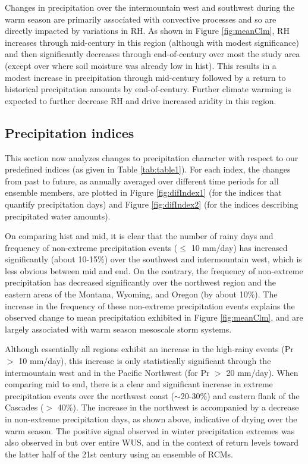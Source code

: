 \documentclass{ametsoc}
\begin{document}
Changes in precipitation over the intermountain west and southwest during the warm season are primarily associated with convective processes and so are directly impacted by variations in RH.  As shown in Figure \ref{fig:meanClm}, RH increases through mid-century in this region (although with modest significance) and then significantly decreases through end-of-century over most the study area (except over where soil moisture was already low in \textsf{hist}).  This results in a modest increase in precipitation through mid-century followed by a return to historical precipitation amounts by end-of-century.  Further climate warming is expected to further decrease RH and drive increased aridity in this region.


\subsection{Precipitation indices}

This section now analyzes changes to precipitation character with respect to our predefined indices (as given in Table \ref{tab:table1}). For each index, the changes from past to future, as annually averaged over different time periods for all ensemble members, are plotted in Figure \ref{fig:difIndex1} (for the indices that quantify precipitation days) and Figure \ref{fig:difIndex2} (for the indices describing precipitated water amounts).


On comparing \textsf{hist} and \textsf{mid}, it is clear that the number of rainy days and frequency of non-extreme precipitation events ($\leq$ 10 mm/day) has increased significantly (about 10-15$\%$) over the southwest and intermountain west, which is less obvious between \textsf{mid} and \textsf{end}. On the contrary, the frequency of non-extreme precipitation has decreased significantly over the northwest region and the eastern areas of the Montana, Wyoming, and Oregon (by about 10$\%$).  The increase in the frequency of these non-extreme precipitation events explains the observed change to mean precipitation exhibited in Figure \ref{fig:meanClm}, and are largely associated with warm season mesoscale storm systems.


Although essentially all regions exhibit an increase in the high-rainy events (Pr $>$ 10 mm/day), this increase is only statistically significant through the intermountain west and in the Pacific Northwest (for Pr $>$ 20 mm/day).  When comparing \textsf{mid} to \textsf{end}, there is a clear and significant increase in extreme precipitation events over the northwest coast ($\sim$20-30$\%$) and eastern flank of the Cascades ($>$ 40$\%$). The increase in the northwest is accompanied by a decrease in non-extreme precipitation days, as shown above, indicative of drying over the warm season. The positive signal observed in winter precipitation extremes was also observed in \cite{dominguez2012changes} but over entire WUS, and in the context of return levels toward the latter half of the 21st century using an ensemble of RCMs. 
\end{document}
